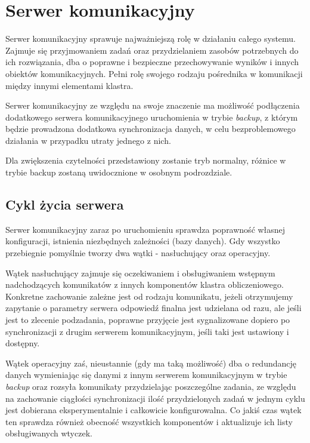\documentclass{report}
\begin{document}
\chapter{Serwer komunikacyjny}
	
	Serwer komunikacyjny sprawuje najważniejszą rolę w działaniu całego systemu. Zajmuje się
	przyjmowaniem zadań oraz przydzielaniem zasobów potrzebnych do ich rozwiązania,
	dba o poprawne i bezpieczne przechowywanie wyników i innych obiektów komunikacyjnych.
	Pełni rolę swojego rodzaju pośrednika w komunikacji między innymi elementami klastra.
	
	Serwer komunikacyjny ze względu na swoje znaczenie ma możliwość podłączenia dodatkowego
	serwera komunikacyjnego uruchomienia w trybie \textit{backup}, z którym będzie
	prowadzona dodatkowa synchronizacja danych, w celu bezproblemowego działania
	w przypadku utraty jednego z nich.
	
	Dla zwiększenia czytelności przedstawiony zostanie tryb normalny, różnice w trybie
	backup zostaną uwidocznione w osobnym podrozdziale.
	
	
\section{Cykl życia serwera}
	Serwer komunikacyjny zaraz po uruchomieniu sprawdza poprawność własnej konfiguracji,
	istnienia niezbędnych zależności (bazy danych). Gdy wszystko przebiegnie pomyślnie
	tworzy dwa wątki - nasłuchujący oraz operacyjny.
	
	Wątek nasłuchujący zajmuje się oczekiwaniem i obsługiwaniem wstępnym nadchodzących 
	komunikatów z innych komponentów klastra obliczeniowego. Konkretne zachowanie zależne
	jest od rodzaju komunikatu, jeżeli otrzymujemy zapytanie o parametry serwera
	odpowiedź finalna jest udzielana od razu, ale jeśli jest to zlecenie podzadania,
	poprawne przyjęcie jest sygnalizowane dopiero po synchronizacji z drugim serwerem
	komunikacyjnym, jeśli taki jest ustawiony i dostępny.
	
	Wątek operacyjny zaś, nieustannie (gdy ma taką możliwość) dba o redundancję danych wymieniając 
	się danymi z innym serwerem komunikacyjnym 	w trybie \textit{backup} oraz rozsyła komunikaty 
	przydzielając poszczególne zadania,	ze względu na zachowanie ciągłości synchronizacji ilość 
	przydzielonych zadań w jednym cyklu jest dobierana eksperymentalnie i całkowicie konfigurowalna.
	Co jakiś czas wątek ten sprawdza również obecność wszystkich komponentów i aktualizuje ich listy
	obsługiwanych wtyczek. 
	
\end{document}
